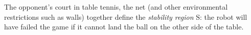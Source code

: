 \documentclass[10pt,a4paper]{article}
\newcommand{\boldvec}[1]{\boldsymbol{\mathrm{#1}}}
\let\vec\boldvec
\newcommand{\court}{\vec{S}} %
\begin{document}




The opponent's court in table tennis, the net (and other environmental restrictions such as walls) together define the \emph{stability region} $\court$: the robot will have failed the game if it cannot land the ball on the other side of the table.
\end{document}

